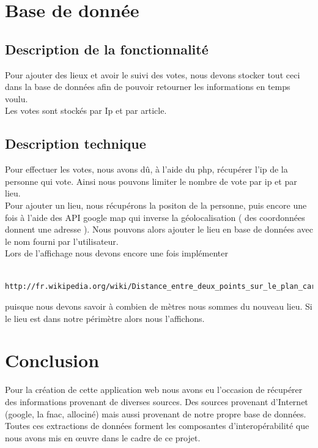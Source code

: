 \documentclass[10pt,a4paper]{report}
\begin{document}

\section{Base de donnée}

\subsection{Description de la fonctionnalité}
\begin{flushleft}
Pour ajouter des lieux et avoir le suivi des votes, nous devons stocker tout ceci dans la base de données afin de pouvoir retourner les informations en temps voulu. \\

Les votes sont stockés par Ip et par article. \\
\end{flushleft}

\subsection{Description technique}
\begin{flushleft}
Pour effectuer les votes, nous avons dû, à l'aide du php, récupérer l'ip de la personne qui vote. Ainsi nous pouvons limiter le nombre de vote par ip et par lieu. \\

Pour ajouter un lieu, nous récupérons la positon de la personne, puis encore une fois à l'aide des API google map qui inverse la géolocalisation ( des coordonnées donnent une adresse ). Nous pouvons alors ajouter le lieu en base de données avec le nom fourni par l'utilisateur. \\

Lors de l'affichage nous devons encore une fois implémenter 
\begin{verbatim}
	http://fr.wikipedia.org/wiki/Distance_entre_deux_points_sur_le_plan_cart%C3%A9sien
\end{verbatim} 
puisque nous devons savoir à combien de mètres nous sommes du nouveau lieu.
Si le lieu est dans notre périmètre alors nous l'affichons.\\
\end{flushleft}



\section{Conclusion}
\begin{flushleft}
Pour la création de cette application web nous avons eu l'occasion de récupérer des informations provenant de diverses sources. Des sources provenant d'Internet (google, la fnac, allociné) mais aussi provenant de notre propre base de données. Toutes ces extractions de données forment les composantes d'interopérabilité que nous avons mis en œuvre dans le cadre de ce projet.
\end{flushleft}
\end{document}
